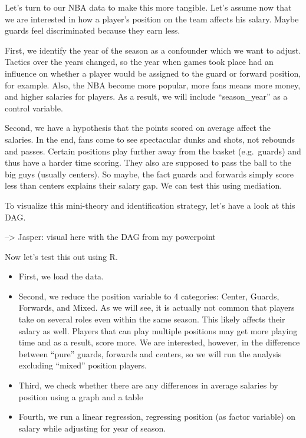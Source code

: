 \documentclass[
]{book}
\providecommand{\tightlist}{%
  \setlength{\itemsep}{0pt}\setlength{\parskip}{0pt}}
\begin{document}
Let's turn to our NBA data to make this more tangible. Let's assume now that we are interested in how a player's position on the team affects his salary. Maybe guards feel
discriminated because they earn less.

First, we identify the year of the season as a confounder which we want to adjust.
Tactics over the years changed, so the year when games took place had an influence on
whether a player would be assigned to the guard or forward position, for example.
Also, the NBA become more popular, more fans means more money, and higher salaries
for players. As a result, we will include ``season\_year'' as a control variable.

Second, we have a hypothesis that the points scored on average affect the salaries.
In the end, fans come to see spectacular dunks and shots, not rebounds and passes.
Certain positions play further away from the basket (e.g.~guards) and thus have a harder time scoring. They also are supposed to pass the ball to the big guys (usually centers).
So maybe, the fact guards and forwards simply score less than centers explains their salary gap. We can test this using mediation.

To visualize this mini-theory and identification strategy, let's have a look at this DAG.

--\textgreater{} Jasper: visual here with the DAG from my powerpoint

Now let's test this out using R.

\begin{itemize}
\tightlist
\item
  First, we load the data.
\item
  Second, we reduce the position variable to 4 categories: Center, Guards, Forwards, and Mixed. As we will see, it is actually not common that players take on several roles even within the same season. This likely affects their salary as well. Players that can play multiple positions may get more playing time and as a result, score more. We are interested, however, in the difference between ``pure'' guards, forwards and centers, so we will run the analysis excluding ``mixed'' position players.
\item
  Third, we check whether there are any differences in average salaries by position using a graph and a table
\item
  Fourth, we run a linear regression, regressing position (as factor variable) on salary while adjusting for year of season.
\end{itemize}
\end{document}
